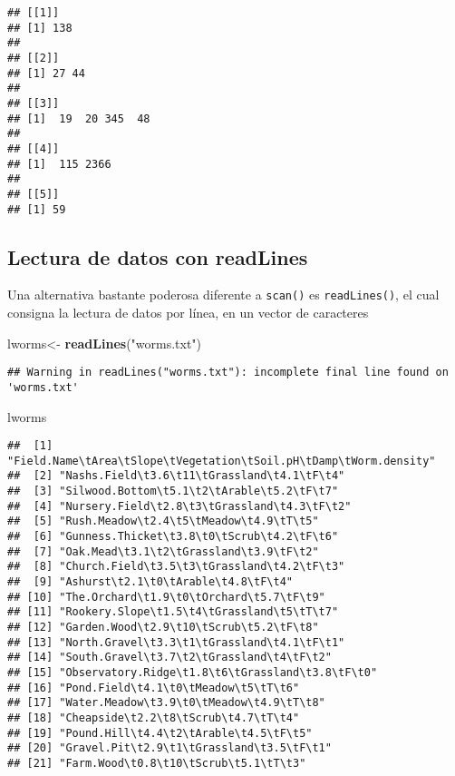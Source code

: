 \documentclass[]{article}
\newenvironment{Shaded}{\begin{snugshade}}{\end{snugshade}}
\newcommand{\KeywordTok}[1]{\textcolor[rgb]{0.13,0.29,0.53}{\textbf{#1}}}
\newcommand{\StringTok}[1]{\textcolor[rgb]{0.31,0.60,0.02}{#1}}
\newcommand{\NormalTok}[1]{#1}
\begin{document}
\begin{verbatim}
## [[1]]
## [1] 138
## 
## [[2]]
## [1] 27 44
## 
## [[3]]
## [1]  19  20 345  48
## 
## [[4]]
## [1]  115 2366
## 
## [[5]]
## [1] 59
\end{verbatim}

\subsection{Lectura de datos con
readLines}\label{lectura-de-datos-con-readlines}

Una alternativa bastante poderosa diferente a \texttt{scan()} es
\texttt{readLines()}, el cual consigna la lectura de datos por línea, en
un vector de caracteres

\begin{Shaded}
\begin{Highlighting}[]
\NormalTok{lworms<-}\StringTok{ }\KeywordTok{readLines}\NormalTok{(}\StringTok{"worms.txt"}\NormalTok{)}
\end{Highlighting}
\end{Shaded}

\begin{verbatim}
## Warning in readLines("worms.txt"): incomplete final line found on 'worms.txt'
\end{verbatim}

\begin{Shaded}
\begin{Highlighting}[]
\NormalTok{lworms}
\end{Highlighting}
\end{Shaded}

\begin{verbatim}
##  [1] "Field.Name\tArea\tSlope\tVegetation\tSoil.pH\tDamp\tWorm.density"
##  [2] "Nashs.Field\t3.6\t11\tGrassland\t4.1\tF\t4"                      
##  [3] "Silwood.Bottom\t5.1\t2\tArable\t5.2\tF\t7"                       
##  [4] "Nursery.Field\t2.8\t3\tGrassland\t4.3\tF\t2"                     
##  [5] "Rush.Meadow\t2.4\t5\tMeadow\t4.9\tT\t5"                          
##  [6] "Gunness.Thicket\t3.8\t0\tScrub\t4.2\tF\t6"                       
##  [7] "Oak.Mead\t3.1\t2\tGrassland\t3.9\tF\t2"                          
##  [8] "Church.Field\t3.5\t3\tGrassland\t4.2\tF\t3"                      
##  [9] "Ashurst\t2.1\t0\tArable\t4.8\tF\t4"                              
## [10] "The.Orchard\t1.9\t0\tOrchard\t5.7\tF\t9"                         
## [11] "Rookery.Slope\t1.5\t4\tGrassland\t5\tT\t7"                       
## [12] "Garden.Wood\t2.9\t10\tScrub\t5.2\tF\t8"                          
## [13] "North.Gravel\t3.3\t1\tGrassland\t4.1\tF\t1"                      
## [14] "South.Gravel\t3.7\t2\tGrassland\t4\tF\t2"                        
## [15] "Observatory.Ridge\t1.8\t6\tGrassland\t3.8\tF\t0"                 
## [16] "Pond.Field\t4.1\t0\tMeadow\t5\tT\t6"                             
## [17] "Water.Meadow\t3.9\t0\tMeadow\t4.9\tT\t8"                         
## [18] "Cheapside\t2.2\t8\tScrub\t4.7\tT\t4"                             
## [19] "Pound.Hill\t4.4\t2\tArable\t4.5\tF\t5"                           
## [20] "Gravel.Pit\t2.9\t1\tGrassland\t3.5\tF\t1"                        
## [21] "Farm.Wood\t0.8\t10\tScrub\t5.1\tT\t3"
\end{verbatim}
\end{document}
